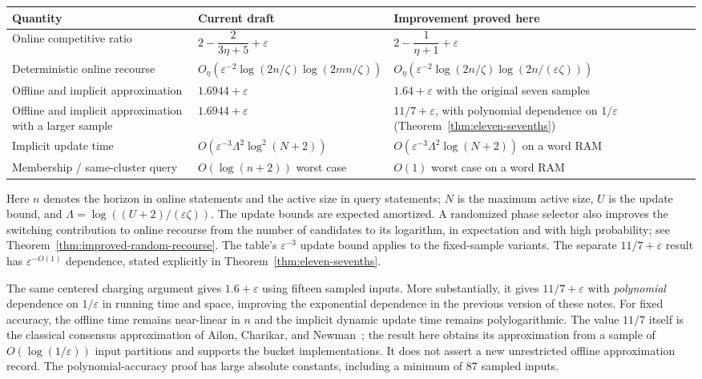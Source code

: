 \documentclass[11pt]{article}
\begin{document}
\begin{center}
\small
\renewcommand{\arraystretch}{1.35}
\begin{tabular}{@{}>{\raggedright\arraybackslash}p{}>{\raggedright\arraybackslash}p{}>{\raggedright\arraybackslash}p{}@{}}
\toprule
Quantity & Current draft & Improvement proved here\\
\midrule
Online competitive ratio
 & $2-\dfrac{2}{3\eta+5}+\varepsilon$
 & $2-\dfrac1{\eta+1}+\varepsilon$\\
Deterministic online recourse
 & $O_\eta(\varepsilon^{-2}\log(2n/\zeta)\log(2mn/\zeta))$
 & $O_\eta(\varepsilon^{-2}\log(2n/\zeta)\log(2n/(\varepsilon\zeta)))$\\
Offline and implicit approximation
 & $1.6944+\varepsilon$
 & $1.64+\varepsilon$ with the original seven samples\\
Offline and implicit approximation with a larger sample
 & $1.6944+\varepsilon$
 & $11/7+\varepsilon$, with polynomial dependence on $1/\varepsilon$
   (Theorem~\ref{thm:eleven-sevenths})\\
Implicit update time
 & $O(\varepsilon^{-3}\Lambda^2\log^2(N+2))$
 & $O(\varepsilon^{-3}\Lambda^2\log(N+2))$ on a word RAM\\
Membership / same-cluster query
 & $O(\log(n+2))$ worst case
 & $O(1)$ worst case on a word RAM\\
\bottomrule
\end{tabular}
\end{center}
Here $n$ denotes the horizon in online statements and the active size
in query statements; $N$ is the maximum active size, $U$ is the update
bound, and $\Lambda=\log((U+2)/(\varepsilon\zeta))$.
The update bounds are expected amortized. A randomized phase selector
also improves the switching contribution to online recourse from the
number of candidates to its logarithm, in expectation and with high
probability; see Theorem~\ref{thm:improved-random-recourse}.
The table's $\varepsilon^{-3}$ update bound applies to the fixed-sample
variants. The separate $11/7+\varepsilon$ result has
$\varepsilon^{-O(1)}$ dependence, stated explicitly in
Theorem~\ref{thm:eleven-sevenths}.

The same centered charging argument gives $1.6+\varepsilon$ using
fifteen sampled inputs. More substantially, it gives $11/7+\varepsilon$
with \emph{polynomial} dependence on $1/\varepsilon$ in running time
and space, improving the exponential dependence in the previous
version of these notes. For fixed accuracy, the offline time remains
near-linear in $n$ and the implicit dynamic update time remains
polylogarithmic. The value $11/7$ itself is the classical consensus
approximation of Ailon, Charikar, and Newman~\cite{acn}; the result here
obtains its approximation from a sample of
$O(\log(1/\varepsilon))$ input partitions and supports the bucket
implementations. It does not assert a new unrestricted offline
approximation record. The polynomial-accuracy proof has large absolute
constants, including a minimum of 87 sampled inputs.
\end{document}
